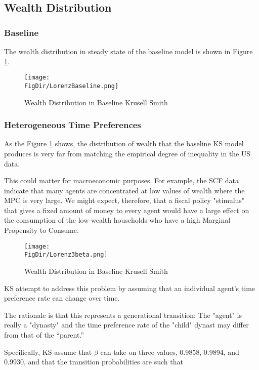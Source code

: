 \documentclass[titlepage]{\econtex}\providecommand{\texname}{KrusellSmithRep}%
\providecommand{\FigDir}{Figures}
\renewcommand{\FigDir}{./Code/Python/Figures}
\begin{document}
\subsection{Wealth Distribution}

\subsubsection{Baseline}

The wealth distribution in steady state of the baseline model is shown in Figure \ref{fig:lorenzbaseline}.

\begin{figure}[tbp]
	\centerline{\texttt{[image: \\FigDir/LorenzBaseline.png]}}
	\caption{Wealth Distribution in Baseline Krusell Smith}
	\label{fig:lorenzbaseline}
\end{figure}


\subsubsection{Heterogeneous Time Preferences}


As the Figure \ref{fig:lorenzbaseline} shows, the distribution of wealth that the baseline KS model produces is very far from matching the empirical degree of inequality in the US data.

This could matter for macroeconomic purposes.  For example, the SCF data indicate that many agents are concentrated at low values of wealth where the MPC is very large.  We might expect, therefore, that a fiscal policy "stimulus" that gives a fixed amount of money to every agent would have a large effect on the consumption of the low-wealth households who have a high Marginal Propensity to Consume.


\begin{figure}[tbp]
	\centerline{\texttt{[image: \\FigDir/Lorenz3beta.png]}}
	\caption{Wealth Distribution in Baseline Krusell Smith}
	\label{fig:lorenz3beta}
\end{figure}


KS attempt to address this problem by assuming that an individual agent's time preference rate can change over time.

The rationale is that this represents a generational transition: The "agent" is really a "dynasty" and the time preference rate of the "child" dynast may differ from that of the ``parent.''

Specifically, KS assume that $\beta$ can take on three values, 0.9858, 0.9894, and 0.9930, and that the transition probabilities are such that 
\end{document}
